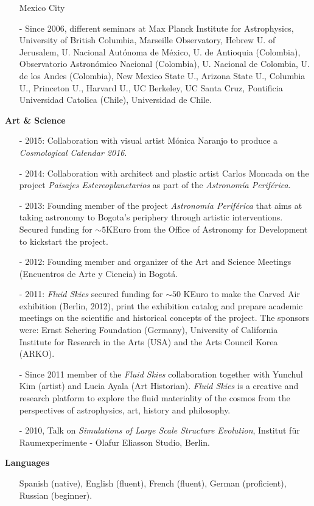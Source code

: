 \documentclass[letterpaper,11pt,onecolumn]{article}
\begin{document}
\begin{itemize}
  Mexico City 
\item [-] Since 2006, different seminars at Max Planck Institute for
  Astrophysics, University of British Columbia, Marseille Observatory,
  Hebrew U. of Jerusalem, U. Nacional Aut\'onoma de M\'exico, U. de
  Antioquia (Colombia), Observatorio Astron\'omico Nacional
  (Colombia), U. Nacional de Colombia, U. de los Andes (Colombia), New
  Mexico State U., Arizona State U., Columbia U., Princeton U.,
  Harvard U., UC Berkeley, UC Santa Cruz, Pontificia Universidad
  Catolica (Chile), Universidad de Chile. 
\end{itemize}


{\Large{{\bf Art \& Science}}}
\begin{itemize}
\item [-] 2015: Collaboration with visual artist M\'onica Naranjo to
  produce a \emph{Cosmological Calendar 2016}. 
\item [-] 2014: Collaboration with architect and plastic artist Carlos
  Moncada on the project \emph{Paisajes Estereoplanetarios} as part of
  the \emph{Astronom\'ia Perif\'erica}. 
\item [-] 2013: Founding member of the project \emph{Astronom\'ia
  Perif\'erica} that aims at taking astronomy to Bogota's periphery
  through artistic interventions.  Secured funding for $\sim 5$KEuro
  from the Office of Astronomy for Development to kickstart the
  project. 
\item [-] 2012: Founding member and organizer of the Art and Science Meetings (Encuentros de Arte y Ciencia) in Bogot\'a.
\item [-] 2011: {\it Fluid Skies} secured funding for $\sim 50$ KEuro
  to make the Carved Air exhibition (Berlin, 2012), print the
  exhibition catalog and prepare academic meetings on the scientific
  and historical concepts of the project. The sponsors were: Ernst
  Schering Foundation (Germany), University of California Institute
  for Research in the Arts (USA) and the Arts Council Korea (ARKO).  
\item [-] Since 2011 member of the {\it Fluid Skies} collaboration
  together with Yunchul Kim (artist) and Lucia Ayala (Art
  Historian). {\it Fluid Skies} is a creative and research platform to
  explore the fluid materiality of the cosmos from the perspectives of
  astrophysics, art, history and philosophy. 
\item [-] 2010, Talk on {\it Simulations of Large Scale Structure
  Evolution}, Institut f\"ur Raumexperimente - Olafur Eliasson Studio,
  Berlin.  
\end{itemize}


{\bf Languages}
\begin{itemize}
\item[]Spanish (native), English (fluent), French (fluent), German
  (proficient), Russian (beginner).
\end{itemize}

\end{document}
